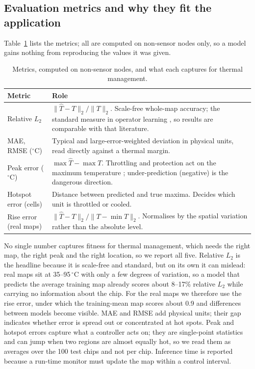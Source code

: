 \documentclass[journal]{IEEEtran}
\begin{document}
\subsection{Evaluation metrics and why they fit the application}
Table~\ref{tab:metrics} lists the metrics; all are computed on non-sensor nodes only, so a model gains nothing from reproducing the values it was given.

\begin{table}[t]
\caption{Metrics, computed on non-sensor nodes, and what each captures for thermal management.}
\label{tab:metrics}
\centering
\footnotesize
\setlength{\tabcolsep}{3pt}
\begin{tabular}{@{}p{}p{}@{}}
\toprule
Metric & Role \\
\midrule
Relative $L_2$ & $\|\hat T-T\|_2/\|T\|_2$. Scale-free whole-map accuracy; the standard measure in operator learning \cite{lu2021deeponet,li2021fno}, so results are comparable with that literature. \\
MAE, RMSE ($^\circ$C) & Typical and large-error-weighted deviation in physical units, read directly against a thermal margin. \\
Peak error ($^\circ$C) & $\max\hat T-\max T$. Throttling and protection act on the maximum temperature \cite{skadron2003temperature,brooks2001dtm}; under-prediction (negative) is the dangerous direction. \\
Hotspot error (cells) & Distance between predicted and true maxima. Decides which unit is throttled or cooled. \\
Rise error (real maps) & $\|\hat T-T\|_2/\|T-\min T\|_2$. Normalises by the spatial variation rather than the absolute level. \\
\bottomrule
\end{tabular}
\end{table}

No single number captures fitness for thermal management, which needs the right map, the right peak and the right location, so we report all five.
Relative $L_2$ is the headline because it is scale-free and standard, but on its own it can mislead: real maps sit at 35--95\,$^\circ$C with only a few degrees of variation, so a model that predicts the average training map already scores about 8--17\% relative $L_2$ while carrying no information about the chip.
For the real maps we therefore use the rise error, under which the training-mean map scores about 0.9 and differences between models become visible.
MAE and RMSE add physical units; their gap indicates whether error is spread out or concentrated at hot spots.
Peak and hotspot errors capture what a controller acts on; they are single-point statistics and can jump when two regions are almost equally hot, so we read them as averages over the 100 test chips and not per chip.
Inference time is reported because a run-time monitor must update the map within a control interval.
\end{document}

